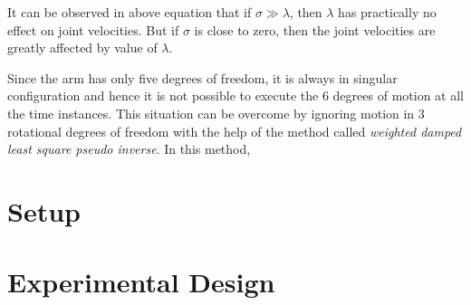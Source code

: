It can be observed in above equation that if $\sigma \gg \lambda$, then $\lambda$ has practically no effect on joint velocities. But if $\sigma$ is close to zero, then the joint velocities are greatly affected by value of $\lambda$.  

Since the arm has only five degrees of freedom, it is always in singular configuration and hence it is not possible to execute the 6 degrees of motion at all the time instances. This situation can be overcome by ignoring motion in 3 rotational degrees of freedom with the help of the method called \textit{weighted damped least square pseudo inverse}. In this method, 	

\section{Setup}
\section{Experimental Design}
